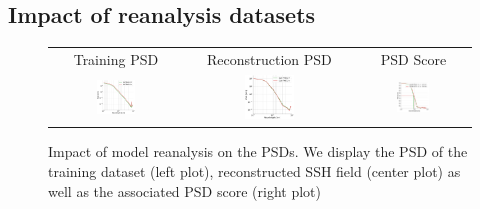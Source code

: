 \documentclass[draft]{agujournal2019}
\begin{document}
\subsection{Impact of reanalysis datasets}
\label{ssec:reanalysis}
\begin{figure}[h]

\small

\setlength{\tabcolsep}{1pt}
\begin{tabular}{ccc}

\hspace{3mm} Training PSD & 
\hspace{3mm} Reconstruction PSD & 
\hspace{3mm} PSD Score  \\


\includegraphics[width=0.31\textwidth]{figures/plots2/isotrop_psd_rea_train.png} &
\includegraphics[width=0.31\textwidth]{figures/plots2/isotrop_psd_rea_rec.png} &
\includegraphics[width=0.31\textwidth]{figures/plots2/rea_1d_psd_score.png}


\end{tabular}
\vspace{-3mm}
\caption{
Impact of model reanalysis on the PSDs. We display the PSD of the training dataset (left plot), reconstructed SSH field (center plot) as well as the associated PSD score (right plot)}\vspace{-5mm}
\label{fig:reapsd}

\end{figure}
\end{document}
